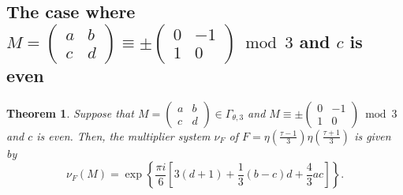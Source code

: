 \documentclass[12pt]{article}
\theoremstyle{definition}
\newtheorem{theorem}{Theorem}
\numberwithin{equation}{section}
\numberwithin{theorem}{section}
\begin{document}
\subsection{The case where 
$
M
=
\begin{pmatrix}
a & b \\
c & d
\end{pmatrix}
\equiv \pm
\begin{pmatrix}
0 & -1 \\
1 & 0
\end{pmatrix} 
\bmod{3}
$ 
and 
$c$ is even
}




\begin{theorem}
\label{thm:M=pmT-c-even}
{\it
Suppose that 
$
M=
\begin{pmatrix}
a & b \\
c & d
\end{pmatrix}
\in 
\Gamma_{\theta,3}
$ 
and 
$M\equiv 
\pm
\begin{pmatrix}
0 & -1 \\
1 & 0
\end{pmatrix} 
\bmod{3}
$ 
and 
$c$ is even. 
Then, 
the multiplier system 
$\nu_{F}$ of 
$
\displaystyle 
F=
\eta \left(\frac{\tau-1}{3} \right) \eta\left(\frac{\tau+1}{3} \right)
$ 
is given by 
\begin{equation*}
\nu_{F}
(M)
=
\exp
\left\{
\frac{\pi i}{6}
\left[
3(d+1)+\frac13(b-c)d+\frac43ac
\right]
\right\}. 
\end{equation*}
}
\end{theorem}
\end{document}
